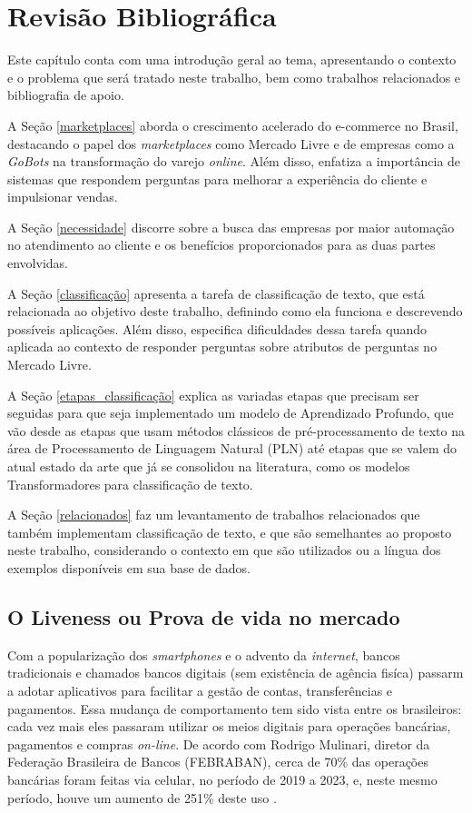 \chapter{Revisão Bibliográfica}
\label{cap-revisao-bibliografica}
Este capítulo conta com uma introdução geral ao tema, apresentando o contexto e o problema que será tratado neste trabalho, bem como trabalhos relacionados e bibliografia de apoio.

A Seção \ref{marketplaces} aborda o crescimento acelerado do e-commerce no Brasil, destacando o papel dos \textit{marketplaces} como Mercado Livre e de empresas como a \textit{GoBots} na transformação do varejo \textit{online}. Além disso, enfatiza a importância de sistemas que respondem perguntas para melhorar a experiência do cliente e impulsionar vendas.

A Seção \ref{necessidade} discorre sobre a busca das empresas por maior automação no atendimento ao cliente e os benefícios proporcionados para as duas partes envolvidas.

A Seção \ref{classificação} apresenta a tarefa de classificação de texto, que está relacionada ao objetivo deste trabalho, definindo como ela funciona e descrevendo possíveis aplicações. Além disso, especifica dificuldades dessa tarefa quando aplicada ao contexto de responder perguntas sobre atributos de perguntas no Mercado Livre.

A Seção \ref{etapas_classificação} explica as variadas etapas que precisam ser seguidas para que seja implementado um modelo de Aprendizado Profundo, que vão desde as etapas que usam métodos clássicos de pré-processamento de texto na área de Processamento de Linguagem Natural (PLN) até etapas que se valem do atual estado da arte que já se consolidou na literatura, como os modelos Transformadores para classificação de texto.

A Seção \ref{relacionados} faz um levantamento de trabalhos relacionados que também implementam classificação de texto, e que são semelhantes ao proposto neste trabalho, considerando o contexto em que são utilizados ou a língua dos exemplos disponíveis em sua base de dados.

\section{O Liveness ou Prova de vida no mercado}
\label{liveness}
Com a popularização dos \textit{smartphones} e o advento da \textit{internet}, bancos tradicionais e chamados bancos digitais (sem existência de agência fisíca) passarm a adotar aplicativos para facilitar a gestão de contas, transferências e pagamentos. Essa mudança de comportamento tem sido vista entre os brasileiros: cada vez mais eles passaram utilizar os meios digitais para operações bancárias, pagamentos e compras \textit{on-line}. De acordo com Rodrigo Mulinari, diretor da Federação Brasileira de Bancos (FEBRABAN), cerca de 70\% das operações bancárias foram feitas via celular, no período de 2019 a 2023, e, neste mesmo período, houve um aumento de 251\% deste uso \cite{febraban2024}.

